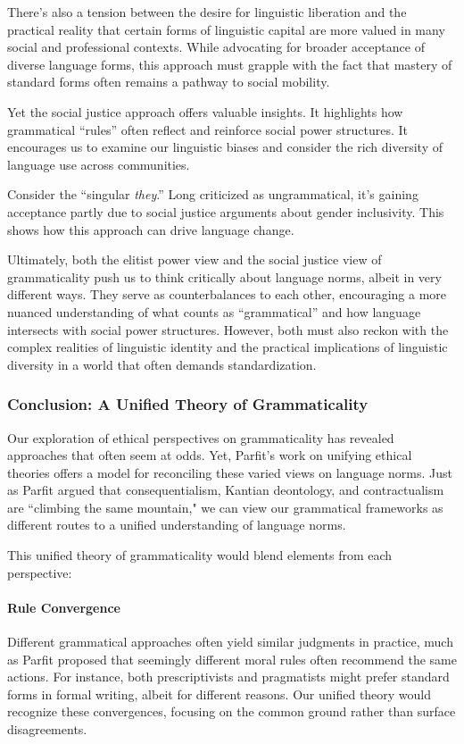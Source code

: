 There's also a tension between the desire for linguistic liberation and the practical reality that certain forms of linguistic capital are more valued in many social and professional contexts. While advocating for broader acceptance of diverse language forms, this approach must grapple with the fact that mastery of standard forms often remains a pathway to social mobility.

Yet the social justice approach offers valuable insights. It highlights how grammatical ``rules'' often reflect and reinforce social power structures. It encourages us to examine our linguistic biases and consider the rich diversity of language use across communities.

Consider the ``singular \textit{they}.'' Long criticized as ungrammatical, it's gaining acceptance partly due to social justice arguments about gender inclusivity. This shows how this approach can drive language change.

Ultimately, both the elitist power view and the social justice view of grammaticality push us to think critically about language norms, albeit in very different ways. They serve as counterbalances to each other, encouraging a more nuanced understanding of what counts as ``grammatical'' and how language intersects with social power structures. However, both must also reckon with the complex realities of linguistic identity and the practical implications of linguistic diversity in a world that often demands standardization.

\subsubsection{Conclusion: A Unified Theory of Grammaticality}

Our exploration of ethical perspectives on grammaticality has revealed approaches that often seem at odds. Yet, Parfit's work on unifying ethical theories offers a model for reconciling these varied views on language norms. Just as Parfit argued that consequentialism, Kantian deontology, and contractualism are ``climbing the same mountain," we can view our grammatical frameworks as different routes to a unified understanding of language norms.

This unified theory of grammaticality would blend elements from each perspective:

\paragraph{Rule Convergence} Different grammatical approaches often yield similar judgments in practice, much as Parfit proposed that seemingly different moral rules often recommend the same actions. For instance, both prescriptivists and pragmatists might prefer standard forms in formal writing, albeit for different reasons. Our unified theory would recognize these convergences, focusing on the common ground rather than surface disagreements.

